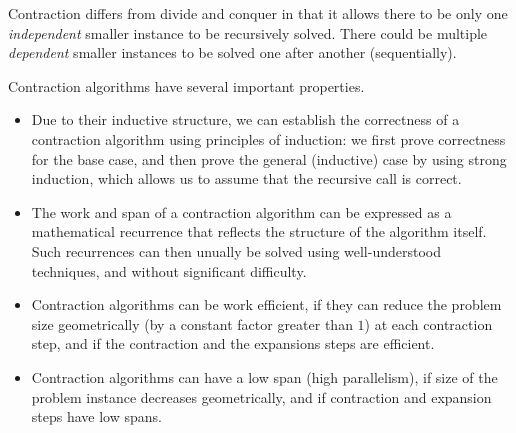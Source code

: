 \begin{remark}
Contraction differs from divide and conquer in that it allows there to
be only one \emph{independent} smaller instance to be recursively
solved.
%
There could be multiple \emph{dependent} smaller instances to be
solved one after another (sequentially).
\end{remark}

\begin{gram}

Contraction algorithms have several important properties.  

\begin{itemize}
\item Due to their inductive structure, we can establish the
  correctness of a contraction algorithm using principles of
  induction: we first prove correctness for the base case, and then
  prove the general (inductive) case by using strong induction, which
  allows us to assume that the recursive call is correct.

\item 
The work and span of a contraction algorithm can be expressed as a
mathematical recurrence that reflects the structure of the algorithm
itself. Such recurrences can then unually be solved using
well-understood techniques, and without significant difficulty.

%
\item 
Contraction algorithms can be work efficient, if they can reduce the
problem size geometrically (by a constant factor greater than $1$) at
each contraction step, and if the contraction and the expansions steps
are efficient.
%

\item Contraction algorithms can have a low span (high parallelism),
  if size of the problem instance decreases geometrically, and if
  contraction and expansion steps have low spans.

\end{itemize}


%
\end{gram}


